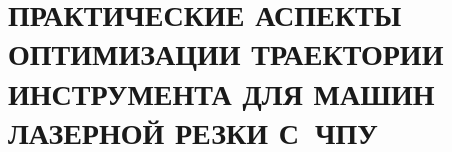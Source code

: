 

\chapter{
  ПРАКТИЧЕСКИЕ АСПЕКТЫ ОПТИМИЗАЦИИ ТРАЕКТОРИИ ИНСТРУМЕНТА
  ДЛЯ МАШИН ЛАЗЕРНОЙ РЕЗКИ С~ЧПУ
}
\setcounter{chapter}{2}
\setcounter{equation}{0}




